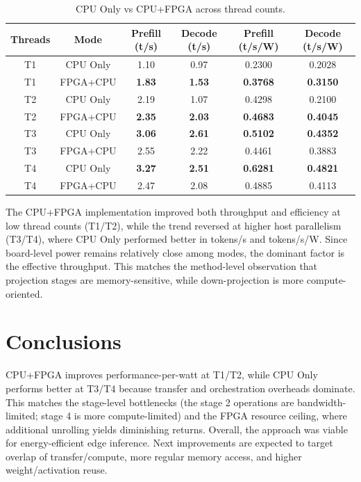 \documentclass[runningheads]{llncs}
\begin{document}
\vspace{-2mm}
\begin{table}[h]
\centering
\scriptsize
\caption{CPU Only vs CPU+FPGA across thread counts.}
\label{tab:short_results}
\setlength{\tabcolsep}{3pt}
\begin{tabular}{c c c c c c}
\hline
Threads & Mode & Prefill (t/s) & Decode (t/s) & Prefill (t/s/W) & Decode (t/s/W) \\
\hline
T1 & CPU Only & 1.10 & 0.97 & 0.2300 & 0.2028 \\
T1 & FPGA+CPU & \textbf{1.83} & \textbf{1.53} & \textbf{0.3768} & \textbf{0.3150} \\
\hline
T2 & CPU Only & 2.19 & 1.07 & 0.4298 & 0.2100 \\
T2 & FPGA+CPU & \textbf{2.35} & \textbf{2.03} & \textbf{0.4683} & \textbf{0.4045} \\
\hline
T3 & CPU Only & \textbf{3.06} & \textbf{2.61} & \textbf{0.5102} & \textbf{0.4352} \\
T3 & FPGA+CPU & 2.55 & 2.22 & 0.4461 & 0.3883 \\
\hline
T4 & CPU Only & \textbf{3.27} & \textbf{2.51} & \textbf{0.6281} & \textbf{0.4821} \\
T4 & FPGA+CPU & 2.47 & 2.08 & 0.4885 & 0.4113 \\
\hline
\end{tabular}
\end{table}
\vspace{-2mm}

The CPU+FPGA implementation improved both throughput and efficiency at low
thread counts (T1/T2), while the trend reversed at higher host parallelism
(T3/T4), where CPU Only performed better in tokens/s and tokens/s/W. Since
board-level power remains relatively close among modes, the dominant factor
is the effective throughput. This matches the method-level observation that
projection stages are memory-sensitive, while down-projection is more
compute-oriented.

\section{Conclusions}\label{sec:discussion_conclusion}
CPU+FPGA improves performance-per-watt at T1/T2, while CPU Only performs
better at T3/T4 because transfer and orchestration overheads dominate. This
matches the stage-level bottlenecks (the stage 2 operations are
bandwidth-limited; stage 4 is more compute-limited) and the FPGA resource
ceiling, where additional unrolling yields diminishing returns. Overall, the
approach was viable for energy-efficient edge inference. Next improvements are
expected to target overlap of transfer/compute, more regular memory access,
and higher weight/activation reuse.
\end{document}

